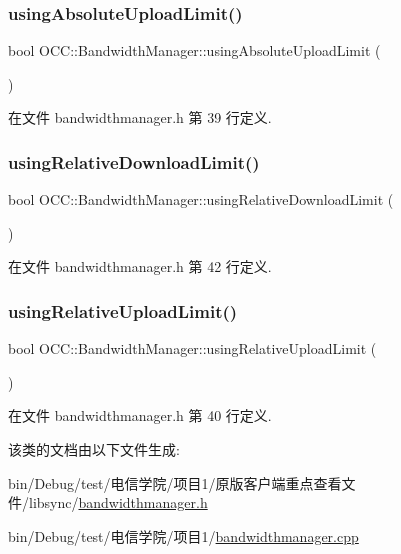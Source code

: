 \subsubsection{\texorpdfstring{using\+Absolute\+Upload\+Limit()}{usingAbsoluteUploadLimit()}}
{\footnotesize\ttfamily bool O\+C\+C\+::\+Bandwidth\+Manager\+::using\+Absolute\+Upload\+Limit (\begin{DoxyParamCaption}{ }\end{DoxyParamCaption})}



在文件 bandwidthmanager.\+h 第 39 行定义.

\mbox{\label{class_o_c_c_1_1_bandwidth_manager_a97a4f769953ac0def1e9095d0bef5623}} 
\subsubsection{\texorpdfstring{using\+Relative\+Download\+Limit()}{usingRelativeDownloadLimit()}}
{\footnotesize\ttfamily bool O\+C\+C\+::\+Bandwidth\+Manager\+::using\+Relative\+Download\+Limit (\begin{DoxyParamCaption}{ }\end{DoxyParamCaption})}



在文件 bandwidthmanager.\+h 第 42 行定义.

\mbox{\label{class_o_c_c_1_1_bandwidth_manager_acb19b946b9c0c3337c21a281e2985498}} 
\subsubsection{\texorpdfstring{using\+Relative\+Upload\+Limit()}{usingRelativeUploadLimit()}}
{\footnotesize\ttfamily bool O\+C\+C\+::\+Bandwidth\+Manager\+::using\+Relative\+Upload\+Limit (\begin{DoxyParamCaption}{ }\end{DoxyParamCaption})}



在文件 bandwidthmanager.\+h 第 40 行定义.



该类的文档由以下文件生成\+:\begin{DoxyCompactItemize}
\item 
bin/\+Debug/test/电信学院/项目1/原版客户端重点查看文件/libsync/\hyperlink{bandwidthmanager_8h}{bandwidthmanager.\+h}\item 
bin/\+Debug/test/电信学院/项目1/\hyperlink{bandwidthmanager_8cpp}{bandwidthmanager.\+cpp}\end{DoxyCompactItemize}
